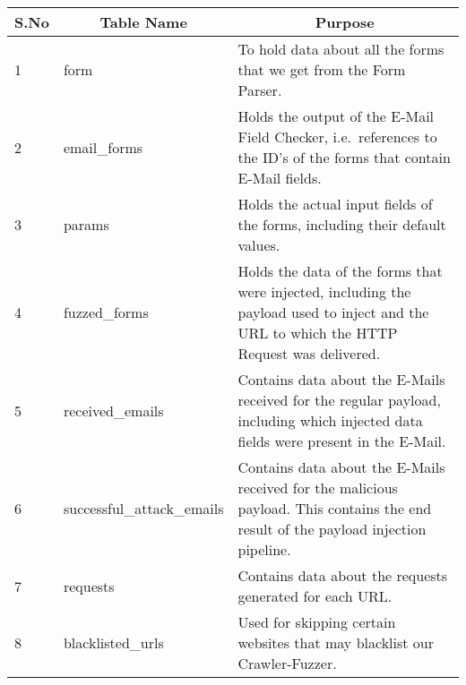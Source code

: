 \begin{tabular}{|p{1cm}|p{5cm}|p{8cm}|}
	\hline
	\multicolumn{1}{|c|}{\textbf{S.No}} & \multicolumn{1}{c}{\textbf{Table Name}} & 
	\multicolumn{1}{|c|}{\textbf{Purpose}}\\
	\hline
	1 & form & To hold data about all the forms that we get from the Form Parser.\\
	\hline
	2 & {{email\_forms}} & Holds the output of the E-Mail Field Checker, i.e.\ references to the ID's of the forms that contain E-Mail fields. \\
	\hline
	3 & params & Holds the actual input fields of the forms, including their default values.\\
	\hline
	4 & {{fuzzed\_forms}} & Holds the data of the forms that were injected, including the payload used to inject and the URL to which the HTTP Request was delivered.\\
	\hline
	5 & {{received\_emails}} & Contains data about the E-Mails received for the regular payload, including which injected data fields were present in the E-Mail.\\
	\hline
	6 & {{successful\_attack\_emails}} & Contains data about the E-Mails received for the malicious payload. This contains the end result of the payload injection pipeline.\\
	\hline
	7 & requests & Contains data about the requests generated for each URL.\\
	\hline
	8 & {{blacklisted\_urls}} & Used for skipping certain websites that may blacklist our Crawler-Fuzzer.\\
	\hline
\end{tabular}